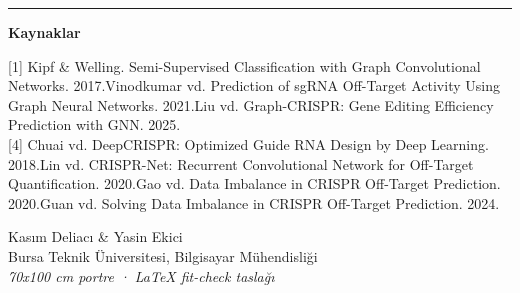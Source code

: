 \documentclass[final]{article}
\begin{document}
\vspace{0.5cm}
{\color{Line}\rule{\linewidth}{1.6pt}}\par
\vspace{0.35cm}

\begin{minipage}[t]{0.72\linewidth}
  {\fontsize{17}{21}\selectfont\bfseries\color{Ink}Kaynaklar\par}
  \vspace{0.14cm}
  {\fontsize{14}{18}\selectfont\color{Muted}
  [1] Kipf \& Welling. Semi-Supervised Classification with Graph Convolutional Networks. 2017.\quad
  [2] Vinodkumar vd. Prediction of sgRNA Off-Target Activity Using Graph Neural Networks. 2021.\quad
  [3] Liu vd. Graph-CRISPR: Gene Editing Efficiency Prediction with GNN. 2025.\\[0.10cm]
  [4] Chuai vd. DeepCRISPR: Optimized Guide RNA Design by Deep Learning. 2018.\quad
  [5] Lin vd. CRISPR-Net: Recurrent Convolutional Network for Off-Target Quantification. 2020.\quad
  [6] Gao vd. Data Imbalance in CRISPR Off-Target Prediction. 2020.\quad
  [7] Guan vd. Solving Data Imbalance in CRISPR Off-Target Prediction. 2024.\par}
\end{minipage}
\hfill
\begin{minipage}[t]{0.25\linewidth}
  \RaggedLeft
  {\fontsize{15}{19}\selectfont\color{Muted}
  Kasım Deliacı \& Yasin Ekici\\
  Bursa Teknik Üniversitesi, Bilgisayar Mühendisliği\\
  \textit{70x100 cm portre · LaTeX fit-check taslağı}\par}
\end{minipage}
\end{document}
